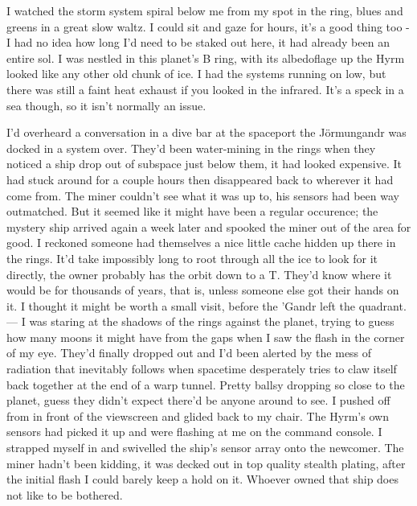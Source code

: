 I watched the storm system spiral below me from my spot in the ring, blues and greens in a great slow waltz. I could sit and gaze for hours, it's a good thing too - I had no idea how long I'd need to be staked out here, it had already been an entire sol. I was nestled in this planet's B ring, with its albedoflage up the Hyrm looked like any other old chunk of ice. I had the systems running on low, but there was still a faint heat exhaust if you looked in the infrared. It's a speck in a sea though, so it isn't normally an issue. 

I'd overheard a conversation in a dive bar at the spaceport the J{\"o}rmungandr was docked in a system over. They'd been water-mining in the rings when they noticed a ship drop out of subspace just below them, it had looked expensive. It had stuck around for a couple hours then disappeared back to wherever it had come from. The miner couldn't see what it was up to, his sensors had been way outmatched. But it seemed like it might have been a regular occurence; the mystery ship arrived again a week later and spooked the miner out of the area for good. I reckoned someone had themselves a nice little cache hidden up there in the rings. It'd take impossibly long to root through all the ice to look for it directly, the owner probably has the orbit down to a T. They'd know where it would be for thousands of years, that is, unless someone else got their hands on it. I thought it might be worth a small visit, before the 'Gandr left the quadrant.
\vspace{0.5mm}
\newline
---
\vspace{0.5mm}
\newline
I was staring at the shadows of the rings against the planet, trying to guess how many moons it might have from the gaps when I saw the flash in the corner of my eye. They'd finally dropped out and I'd been alerted by the mess of radiation that inevitably follows when spacetime desperately tries to claw itself back together at the end of a warp tunnel. Pretty ballsy dropping so close to the planet, guess they didn't expect there'd be anyone around to see. I pushed off from in front of the viewscreen and glided back to my chair. The Hyrm's own sensors had picked it up and were flashing at me on the command console. I strapped myself in and swivelled the ship's sensor array onto the newcomer. The miner hadn't been kidding, it was decked out in top quality stealth plating, after the initial flash I could barely keep a hold on it. Whoever owned that ship does not like to be bothered. 

